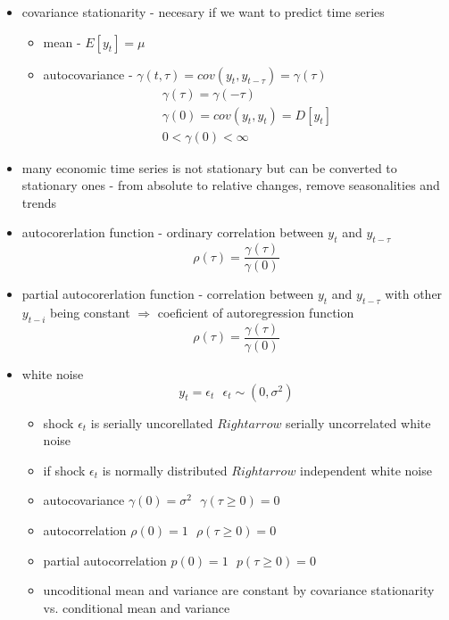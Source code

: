 \begin{itemize}
\item covariance stationarity - necesary if we want to predict time series
\begin{itemize}
\item mean - $E[y_t] = \mu$
\item autocovariance - $\gamma(t, \tau) = cov(y_t, y_{t-\tau}) = \gamma(\tau)$
\begin{gather*}
\gamma(\tau) = \gamma(-\tau)\\
\gamma(0) = cov(y_t, y_t) = D[y_t]\\
0 < \gamma(0) < \infty
\end{gather*}
\end{itemize}
\item many economic time series is not stationary but can be converted to stationary ones - from absolute to relative changes, remove seasonalities and trends
\item autocorerlation function - ordinary correlation between $y_t$ and $y_{t-\tau}$
\begin{equation*}
\rho(\tau) = \frac{\gamma(\tau)}{\gamma(0)}
\end{equation*}
\item partial autocorerlation function - correlation between $y_t$ and $y_{t-\tau}$ with other $y_{t-i}$ being constant $\Rightarrow$ coeficient of autoregression function
\begin{equation*}
\rho(\tau) = \frac{\gamma(\tau)}{\gamma(0)}
\end{equation*}
\item white noise
\begin{equation*}
y_t = \epsilon_t ~~~ \epsilon_t \sim (0, \sigma^2)
\end{equation*}
\begin{itemize}
\item shock $\epsilon_t$ is serially uncorellated $Rightarrow$ serially uncorrelated white noise
\item if shock $\epsilon_t$ is normally distributed $Rightarrow$ independent white noise
\item autocovariance $\gamma(0) = \sigma^2 ~~~ \gamma(\tau \ge 0) = 0$
\item autocorrelation $\rho(0) = 1 ~~~ \rho(\tau \ge 0) = 0$
\item partial autocorrelation $p(0) = 1 ~~~ p(\tau \ge 0) = 0$
\item uncoditional mean and variance are constant by covariance stationarity vs. conditional mean and variance

\end{itemize}
\end{itemize}
